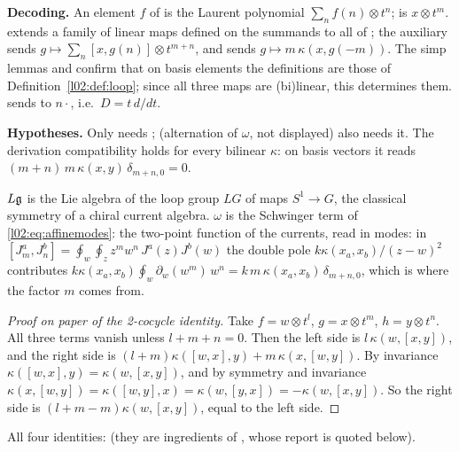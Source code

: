 \begin{dictionary}
\textbf{Decoding.} An element $f$ of  is the Laurent polynomial
$\sum_n f(n)\otimes t^n$;  is $x\otimes t^m$.  extends a family
of linear maps defined on the summands  to all of ; the auxiliary
 sends $g\mapsto\sum_n[x,g(n)]\otimes t^{m+n}$, and 
sends $g\mapsto m\,\kappa(x,g(-m))$. The simp lemmas \allowbreak{} and
 confirm that on basis elements the definitions are those of
Definition~\ref{l02:def:loop}; since all three maps are (bi)linear, this determines them.
 sends  to $n\cdot$, i.e.\ $D = t\,d/dt$.

\textbf{Hypotheses.} Only  needs ;  (alternation
of $\omega$, not displayed) also needs it. The derivation compatibility
\allowbreak{} holds for every bilinear $\kappa$: on basis vectors it reads
$(m+n)\,m\,\kappa(x,y)\,\delta_{m+n,0} = 0$.
\end{dictionary}

\begin{physics}
$L\mathfrak{g}$ is the Lie algebra of the loop group $LG$ of maps $S^1\to G$, the classical symmetry of
a chiral current algebra. $\omega$ is the Schwinger term of \eqref{l02:eq:affinemodes}: the
two-point function of the currents, read in modes: in $[J^a_m,J^b_n] = \oint_w\oint_{z}z^mw^n\,J^a(z)J^b(w)$
the double pole $k\kappa(x_a,x_b)/(z-w)^2$ contributes
$k\kappa(x_a,x_b)\oint_w\partial_w(w^m)\,w^n = k\,m\,\kappa(x_a,x_b)\,\delta_{m+n,0}$, which is where the factor $m$
comes from.
\end{physics}

\begin{proof}[Proof on paper of the 2-cocycle identity]
Take $f = w\otimes t^l$, $g = x\otimes t^m$, $h = y\otimes t^n$. All three terms vanish unless
$l+m+n=0$. Then the left side is $l\,\kappa(w,[x,y])$, and the right side is
$(l+m)\kappa([w,x],y) + m\,\kappa(x,[w,y])$. By invariance $\kappa([w,x],y) = \kappa(w,[x,y])$, and
by symmetry and invariance $\kappa(x,[w,y]) = \kappa([w,y],x) = \kappa(w,[y,x]) = -\kappa(w,[x,y])$. So
the right side is $(l+m-m)\kappa(w,[x,y])$, equal to the left side.
\end{proof}

\begin{status}
All four identities:  (they are ingredients of
, whose report is quoted below).
\end{status}

